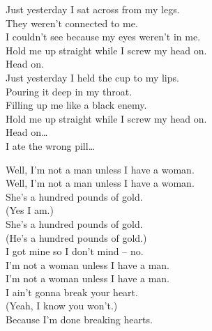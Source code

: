 
\label{album:float-along-fill-your-lungs}




Just yesterday I sat across from my legs. \\
They weren't connected to me. \\
I couldn't see because my eyes weren't in me. \\
Hold me up straight while I screw my head on. \\

Head on. \\

Just yesterday I held the cup to my lips. \\
Pouring it deep in my throat. \\
Filling up me like a black enemy. \\
Hold me up straight while I screw my head on. \\

Head on… \\
I ate the wrong pill… \\




Well, I'm not a man unless I have a woman. \\
Well, I'm not a man unless I have a woman. \\

She's a hundred pounds of gold. \\
(Yes I am.) \\
She's a hundred pounds of gold. \\
(He's a hundred pounds of gold.) \\
I got mine so I don't mind -- no. \\

I'm not a woman unless I have a man. \\
I'm not a woman unless I have a man. \\

I ain't gonna break your heart. \\
(Yeah, I know you won't.) \\
Because I'm done breaking hearts. \\

